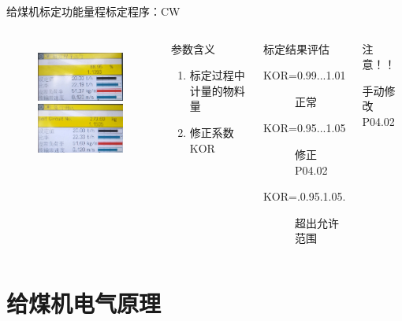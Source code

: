 \documentclass[12pt,hyperref={CJKbookmarks=true}]{beamer} %
\begin{document}
\begin{frame}{给煤机标定功能}{量程标定程序：CW}
  		\begin{columns}
\begin{figure}
\includegraphics[angle=0,width=150pt,trim=0 0 0 0,clip]{picture/CWing.jpg}\\
\includegraphics[angle=0,width=150pt,trim=0 0 0 0,clip]{picture/CWed.jpg}
	
\end{figure}
\begin{block}{参数含义}
			\begin{enumerate}
				\item 标定过程中计量的物料量
				\item  修正系数KOR
				\end{enumerate}
\end{block}
\begin{exampleblock}{标定结果评估}
			\begin{description}
				\item[KOR=0.99...1.01]正常
				\item[KOR=0.95...1.05]修正P04.02
				\item[KOR=.0.95.1.05.]超出允许范围
				\end{description}
\end{exampleblock}
\begin{alertblock}{注意！！}
			
				手动修改P04.02
\end{alertblock}
		\end{columns}
	\end{frame}
	\section{给煤机电气原理}
\end{document}
